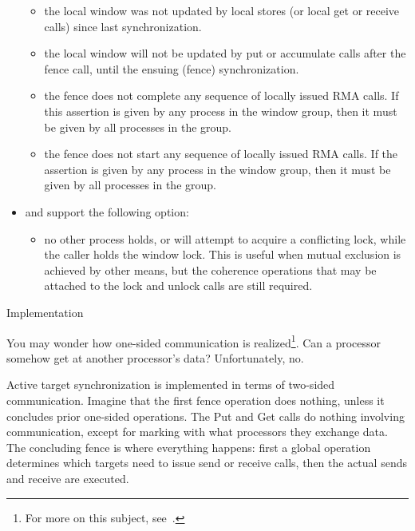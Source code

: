 \begin{itemize}
  \begin{itemize}
  \item {} the local window was not updated by local
    stores (or local get or receive calls) since last synchronization.
  \item {} the local window will not be updated by put or
    accumulate calls after the fence call, until the ensuing (fence)
    synchronization.
  \item {} the fence does not complete any sequence of
    locally issued RMA calls. If this assertion is given by any
    process in the window group, then it must be given by all
    processes in the group.
  \item {} the fence does not start any
    sequence of locally issued RMA calls. If the assertion is given by
    any process in the window group, then it must be given by all
    processes in the group.
  \end{itemize}
\item {} and 
  support the following option:
  \begin{itemize}
    \item {} no other process holds, or will attempt to
    acquire a conflicting lock, while the caller holds the window
    lock. This is useful when mutual exclusion is achieved by other
    means, but the coherence operations that may be attached to the
    lock and unlock calls are still required.
  \end{itemize}
\end{itemize}

 {Implementation}

You may wonder how one-sided communication is realized\footnote{For
  more on this subject, see~\cite{thakur:ijhpca-sync}.}. Can a processor
somehow get at another processor's data? Unfortunately, no.

Active target synchronization is implemented in terms of two-sided communication.
Imagine that the first fence operation does nothing, unless it concludes prior
one-sided operations. The Put and Get calls do nothing involving communication,
except for marking with what processors they exchange data.
The concluding fence is where everything happens: first a global operation
determines which targets need to issue send or receive calls, then the
actual sends and receive are executed.

